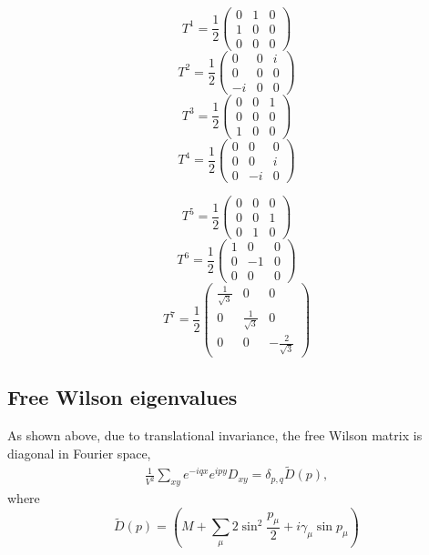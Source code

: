 \documentclass[letter,10pt]{report}
\begin{document}
$$
T^1 =
\frac{1}{2} \left(
\begin{array}{ccc}
0  & 1 & 0 \\
1  & 0 & 0\\
0  & 0 & 0
  \end{array}\right)
$$
$$
T^2 =
\frac{1}{2} \left(
\begin{array}{ccc}
0  & 0 & i \\
0  & 0 & 0\\
-i  & 0 & 0
  \end{array}\right)
$$
$$
T^3 =
\frac{1}{2} \left(
\begin{array}{ccc}
0  & 0 & 1 \\
0  & 0 & 0\\
1  & 0 & 0
  \end{array}\right)
$$
$$
T^4 =
\frac{1}{2} \left(
\begin{array}{ccc}
0  & 0 & 0 \\
0  & 0 & i\\
0  & -i & 0
  \end{array}\right)
$$

$$
T^5 =
\frac{1}{2} \left(
\begin{array}{ccc}
0  & 0 & 0 \\
0  & 0 & 1\\
0  & 1 & 0
  \end{array}\right)
$$
$$
T^6 =
\frac{1}{2} \left(
\begin{array}{ccc}
1  & 0 & 0 \\
0  & -1 & 0\\
0  & 0 & 0
  \end{array}\right)
$$
$$
T^7 =
\frac{1}{2} \left(
\begin{array}{ccc}
\frac{1}{\sqrt{3}}  & 0 & 0 \\
0  & \frac{1}{\sqrt{3}} & 0\\
0  & 0 & -\frac{2}{\sqrt{3}}
  \end{array}\right)
$$

\subsection{Free Wilson eigenvalues}

As shown above, due to translational invariance, the free Wilson matrix is diagonal in Fourier space,
\begin{eqnarray}
 \frac{1}{V^2} \sum_{xy}  e^{-iqx} e^{ipy} D_{xy}
= \delta_{p,q} \tilde{D}(p),
\end{eqnarray}
where
$$
\tilde{D}(p) = \left( M + \sum_\mu 2 \sin^2 \frac{p_\mu}{2} + i \gamma_\mu \sin p_\mu \right)
$$
\end{document}
